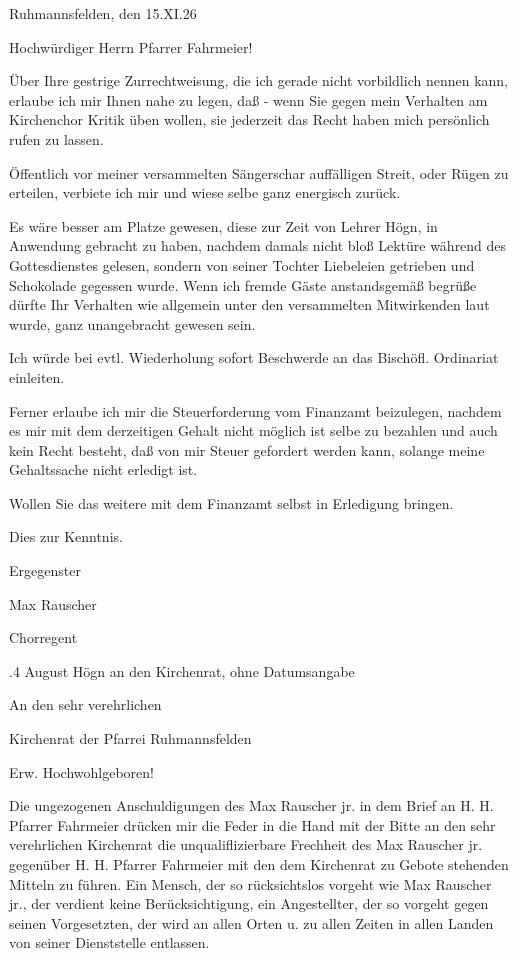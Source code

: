 \documentclass{book}
\begin{document}
Ruhmannsfelden, den 15.XI.26



Hochwürdiger Herrn Pfarrer Fahrmeier!



Über Ihre gestrige Zurrechtweisung, die ich gerade nicht vorbildlich nennen
kann, erlaube ich mir Ihnen nahe zu legen, daß - wenn Sie gegen mein Verhalten
am Kirchenchor Kritik üben wollen, sie jederzeit das Recht haben mich persönlich
rufen zu lassen.

Öffentlich vor meiner versammelten Sängerschar auffälligen Streit, oder Rügen zu
erteilen, verbiete ich mir und wiese selbe ganz energisch zurück.

Es wäre besser am Platze gewesen, diese zur Zeit von Lehrer Högn, in Anwendung
gebracht zu haben, nachdem damals nicht bloß Lektüre während des Gottesdienstes
gelesen, sondern von seiner Tochter Liebeleien getrieben und Schokolade gegessen
wurde. Wenn ich fremde Gäste anstandsgemäß begrüße dürfte Ihr Verhalten wie
allgemein unter den versammelten Mitwirkenden laut wurde, ganz unangebracht
gewesen sein.

Ich würde bei evtl. Wiederholung sofort Beschwerde an das Bischöfl. Ordinariat
einleiten.

Ferner erlaube ich mir die Steuerforderung vom Finanzamt beizulegen, nachdem es
mir mit dem derzeitigen Gehalt nicht möglich ist selbe zu bezahlen und auch kein
Recht besteht, daß von mir Steuer gefordert werden kann, solange meine
Gehaltssache nicht erledigt ist.

Wollen Sie das weitere mit dem Finanzamt selbst in Erledigung bringen.



Dies zur Kenntnis.



    Ergegenster



        Max Rauscher

            Chorregent

.4 August Högn an den Kirchenrat, ohne Datumsangabe



An den sehr verehrlichen

Kirchenrat der Pfarrei Ruhmannsfelden



Erw. Hochwohlgeboren!



Die ungezogenen Anschuldigungen des Max Rauscher jr. in dem Brief an H. H.
Pfarrer Fahrmeier drücken mir die Feder in die Hand mit der Bitte an den sehr
verehrlichen Kirchenrat die unqualiflizierbare Frechheit des Max Rauscher jr.
gegenüber H. H. Pfarrer Fahrmeier mit den dem Kirchenrat zu Gebote stehenden
Mitteln zu führen. Ein Mensch, der so rücksichtslos vorgeht wie Max Rauscher
jr., der verdient keine Berücksichtigung, ein Angestellter, der so vorgeht gegen
seinen Vorgesetzten, der wird an allen Orten u. zu allen Zeiten in allen Landen
von seiner Dienststelle entlassen.
\end{document}
